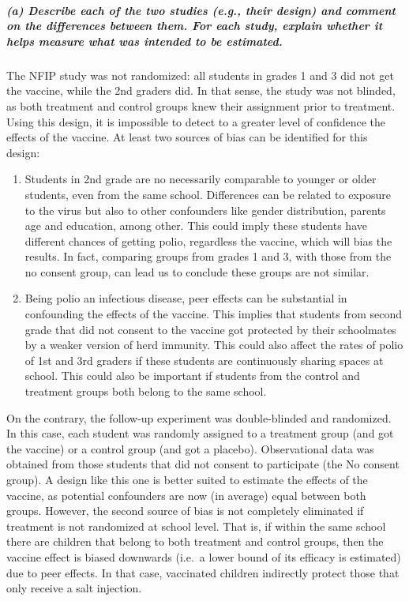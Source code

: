 \documentclass[11pt, english]{article}
\begin{document}
    \hypertarget{a-describe-each-of-the-two-studies-e.g.-their-design-and-comment-on-the-differences-between-them.-for-each-study-explain-whether-it-helps-measure-what-was-intended-to-be-estimated.}{%
\subparagraph{(a) Describe each of the two studies (e.g., their design)
and comment on the differences between them. For each study, explain
whether it helps measure what was intended to be
estimated.\\[2ex]}\label{a-describe-each-of-the-two-studies-e.g.-their-design-and-comment-on-the-differences-between-them.-for-each-study-explain-whether-it-helps-measure-what-was-intended-to-be-estimated.}}

    The NFIP study was not randomized: all students in grades 1 and 3 did
not get the vaccine, while the 2nd graders did. In that sense, the study
was not blinded, as both treatment and control groups knew their
assignment prior to treatment. Using this design, it is impossible to
detect to a greater level of confidence the effects of the vaccine. At
least two sources of bias can be identified for this design:
\begin{enumerate}
\item Students in 2nd grade are no necessarily comparable to younger or older
students, even from the same school. Differences can be related to
exposure to the virus but also to other confounders like gender
distribution, parents age and education, among other. This could imply
these students have different chances of getting polio, regardless the
vaccine, which will bias the results. In fact, comparing groups from
grades 1 and 3, with those from the no consent group, can lead us to
conclude these groups are not similar.

\item Being polio an infectious disease, peer effects can be substantial in
confounding the effects of the vaccine. This implies that students from
second grade that did not consent to the vaccine got protected by their
schoolmates by a weaker version of herd immunity. This could also affect
the rates of polio of 1st and 3rd graders if these students are
continuously sharing spaces at school. This could also be important if
students from the control and treatment groups both belong to the same
school.
\end{enumerate}
On the contrary, the follow-up experiment was double-blinded and
randomized. In this case, each student was randomly assigned to a
treatment group (and got the vaccine) or a control group (and got a
placebo). Observational data was obtained from those students that did
not consent to participate (the No consent group). A design like this
one is better suited to estimate the effects of the vaccine, as
potential confounders are now (in average) equal between both groups.
However, the second source of bias is not completely eliminated if
treatment is not randomized at school level. That is, if within the same
school there are children that belong to both treatment and control
groups, then the vaccine effect is biased downwards (i.e.~a lower bound
of its efficacy is estimated) due to peer effects. In that case,
vaccinated children indirectly protect those that only receive a salt
injection.
\end{document}
